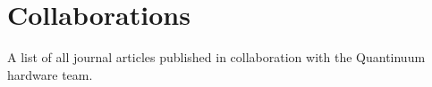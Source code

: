 \documentclass[aps, prl, preprintnumbers, twocolumn, superscriptaddress, nofootinbib, floatfix, 10pt]{revtex4-1}
\begin{document}
\section{Collaborations}

A list of all journal articles published in collaboration with the Quantinuum hardware team.



\nocite{*}
\end{document}
